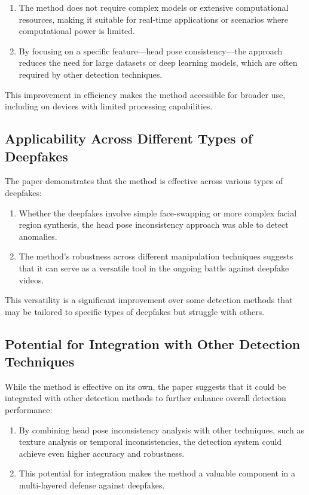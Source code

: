 \documentclass{report}
\begin{document}
	\begin{enumerate}
		\item 
		The method does not require complex models or extensive computational resources, making it suitable for real-time applications or scenarios where computational power is limited.
		
		\item 
		By focusing on a specific feature—head pose consistency—the approach reduces the need for large datasets or deep learning models, which are often required by other detection techniques.
	\end{enumerate}
	This improvement in efficiency makes the method accessible for broader use, including on devices with limited processing capabilities.
	
	
	\subsection{Applicability Across Different Types of Deepfakes}
	The paper demonstrates that the method is effective across various types of deepfakes:
	\begin{enumerate}
		\item 
		Whether the deepfakes involve simple face-swapping or more complex facial region synthesis, the head pose inconsistency approach was able to detect anomalies.
		
		\item 
		The method's robustness across different manipulation techniques suggests that it can serve as a versatile tool in the ongoing battle against deepfake videos.
	\end{enumerate}
	This versatility is a significant improvement over some detection methods that may be tailored to specific types of deepfakes but struggle with others.
	
	
	\subsection{Potential for Integration with Other Detection Techniques}
	While the method is effective on its own, the paper suggests that it could be integrated with other detection methods to further enhance overall detection performance:
	\begin{enumerate}
		\item 
		By combining head pose inconsistency analysis with other techniques, such as texture analysis or temporal inconsistencies, the detection system could achieve even higher accuracy and robustness.
		
		\item 
		This potential for integration makes the method a valuable component in a multi-layered defense against deepfakes.
	\end{enumerate}
	
\end{document}

